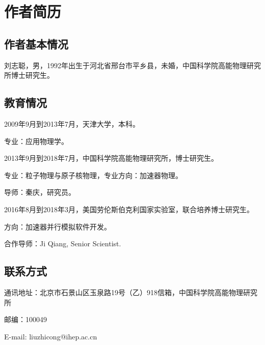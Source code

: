 \chapter{作者简历}

\section*{作者基本情况}

刘志聪，男，1992年出生于河北省邢台市平乡县，未婚，中国科学院高能物理研究所博士研究生。

\section*{教育情况}
\noindent
2009年9月到2013年7月，天津大学，本科。

专业：应用物理学。

\noindent
2013年9月到2018年7月，中国科学院高能物理研究所，博士研究生。

专业：粒子物理与原子核物理，专业方向：加速器物理。

导师：秦庆，研究员。

\noindent
2016年8月到2018年3月，美国劳伦斯伯克利国家实验室，联合培养博士研究生。

方向：加速器并行模拟软件开发。

合作导师：Ji Qiang, Senior Scientist.

\section*{联系方式}

通讯地址：北京市石景山区玉泉路19号（乙）918信箱，中国科学院高能物理研究所

邮编：100049

E-mail: liuzhicong@ihep.ac.cn

